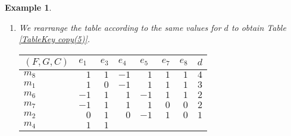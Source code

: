 \documentclass{amsart}
\theoremstyle{plain}
\newtheorem{example}{Example}
\numberwithin{equation}{section}
\begin{document}
\begin{example}
\begin{enumerate}
We note that\begin{eqnarray*}
IND(C)
&=&\{(m_{1},m_{1}),(m_{2},m_{2}),(m_{3},m_{3}),(m_{4},m_{4}),(m_{5},m_{5}),(m_{6},m_{6}),(m_{7},m_{7}),(m_{8},m_{8})\}
\\
&\subset
&\{(m_{1},m_{1}),(m_{2},m_{2}),(m_{3},m_{3}),(m_{4},m_{4}),(m_{5},m_{5}),(m_{6},m_{6}),(m_{7},m_{7}),(m_{8},m_{8}),
\\
&&(m_{5},m_{4}),(m_{4},m_{5}),(m_{6},m_{7}),(m_{6},m_{7})\} \\
&=&IND(D)\text{.}
\end{eqnarray*}Hence the decision table is consistent.

\item We rearrange the table according to the same values for $d$ to obtain
Table \ref{TableKey copy(5)}.

\begin{table}[h] \centering\begin{tabular}{||l||l|l|l|l|l|l|l|}
\hline\hline
$(F,G,C)$ & $e_{1}$ & \multicolumn{1}{||l|}{$e_{3}$} & \multicolumn{1}{||l|}{$e_{4}$} & \multicolumn{1}{||l|}{$e_{5}$} & \multicolumn{1}{||l|}{$e_{7}$} & 
\multicolumn{1}{||l|}{$e_{8}$} & \multicolumn{1}{||l||}{$d$} \\ \hline\hline
$m_{8}$ & \multicolumn{1}{||r|}{$1$} & \multicolumn{1}{|r|}{$1$} & 
\multicolumn{1}{|r|}{$-1$} & \multicolumn{1}{|r|}{$1$} & 
\multicolumn{1}{|r|}{$1$} & \multicolumn{1}{|r|}{$1$} & \multicolumn{1}{|r|}{$4$} \\ \hline\hline
$m_{1}$ & \multicolumn{1}{||r|}{$1$} & \multicolumn{1}{|r|}{$0$} & 
\multicolumn{1}{|r|}{$-1$} & \multicolumn{1}{|r|}{$1$} & 
\multicolumn{1}{|r|}{$1$} & \multicolumn{1}{|r|}{$1$} & \multicolumn{1}{|r|}{$3$} \\ \hline\hline
$m_{6}$ & \multicolumn{1}{||r|}{$-1$} & \multicolumn{1}{|r|}{$1$} & 
\multicolumn{1}{|r|}{$1$} & \multicolumn{1}{|r|}{$-1$} & 
\multicolumn{1}{|r|}{$1$} & \multicolumn{1}{|r|}{$1$} & \multicolumn{1}{|r|}{$2$} \\ \hline
$m_{7}$ & \multicolumn{1}{||r|}{$-1$} & \multicolumn{1}{|r|}{$1$} & 
\multicolumn{1}{|r|}{$1$} & \multicolumn{1}{|r|}{$1$} & \multicolumn{1}{|r|}{$0$} & \multicolumn{1}{|r|}{$0$} & \multicolumn{1}{|r|}{$2$} \\ \hline\hline
$m_{2}$ & \multicolumn{1}{||r|}{$0$} & \multicolumn{1}{|r|}{$1$} & 
\multicolumn{1}{|r|}{$0$} & \multicolumn{1}{|r|}{$-1$} & 
\multicolumn{1}{|r|}{$1$} & \multicolumn{1}{|r|}{$0$} & \multicolumn{1}{|r|}{$1$} \\ \hline\hline
$m_{4}$ & \multicolumn{1}{||r|}{$1$} & \multicolumn{1}{|r|}{$1$} & 

\end{tabular}
\end{table}
\end{enumerate}
\end{example}
\end{document}
